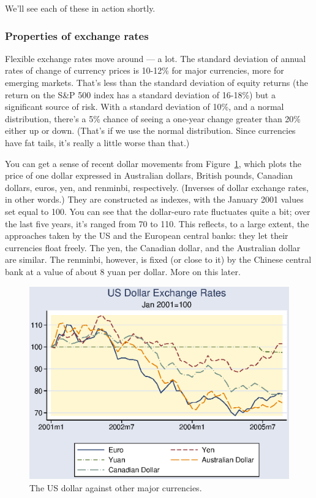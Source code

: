 \documentclass[letterpaper,12pt]{article}
\begin{document}
\begin{itemize}
\end{itemize}
%
We'll see each of these in action shortly.


\subsubsection*{Properties of exchange rates}

Flexible exchange rates move around --- a lot.
The standard deviation of annual rates of change of currency prices
is 10-12\% for major currencies, more for emerging markets.
That's less than the standard deviation of equity returns
(the return on the S\&P 500 index has a standard deviation of 16-18\%)
but a significant source of risk.
With a standard deviation of 10\%, and a normal distribution,
there's a 5\% chance of seeing a one-year change greater than 20\%
either up or down.
(That's if we use the normal distribution.
Since currencies have fat tails, it's really a little worse than that.)


You can get a sense of recent dollar movements from
Figure~\ref{fig:exch_rates},
which plots the price of one dollar expressed in Australian dollars,
British pounds, Canadian dollars, euros, yen, and renminbi, respectively.
(Inverses of dollar exchange rates, in other words.)
They are constructed as indexes, with the January 2001 values
set equal to 100.
You can see that the dollar-euro rate fluctuates quite a bit;
over the last five years, it's ranged from 70 to 110.
This reflects, to a large extent, the approaches taken by
the US and the European central banks:
they let their currencies float freely.
The yen, the Canadian dollar, and the Australian dollar
are similar.
The renminbi, however, is fixed (or close to it)
by the Chinese central bank at a value of about 8 yuan per dollar.
More on this later.

%
\begin{figure}[h!]
    \centering
    \includegraphics[scale=1.0]{exchange.eps}
    \caption{The US dollar against other major currencies.}
    \label{fig:exch_rates}
\end{figure}
%
\end{document}

